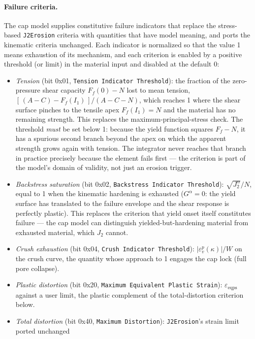 \documentclass[12pt]{article}
\begin{document}
\paragraph{Failure criteria.}
The cap model supplies constitutive failure indicators that replace
the stress-based \texttt{J2Erosion} criteria with quantities that
have model meaning, and ports the kinematic criteria unchanged. Each indicator is normalized so that the value 1
means exhaustion of its mechanism, and each criterion is enabled by
a positive threshold (or limit) in the material input and disabled
at the default 0:
\begin{itemize}
\item \emph{Tension} (bit 0x01, \texttt{Tension Indicator
  Threshold}): the fraction of the zero-pressure shear capacity
  $F_f(0) - N$ lost to mean tension,
  $[\,(A - C) - F_f(I_1)\,]/(A - C - N)$, which reaches 1 where the
  shear surface pinches to the tensile apex $F_f(I_1) = N$ and the
  material has no remaining strength. This replaces the
  maximum-principal-stress check. The threshold \emph{must} be set
  below 1: because the yield function squares $F_f - N$, it has a
  spurious second branch beyond the apex on which the apparent
  strength grows again with tension. The integrator never reaches
  that branch in practice precisely because the element fails
  first --- the criterion is part of the model's domain of validity,
  not just an erosion trigger.
\item \emph{Backstress saturation} (bit 0x02, \texttt{Backstress
  Indicator Threshold}): $\sqrt{J_2^\alpha}/N$, equal to 1 when the
  kinematic hardening is exhausted ($G^\alpha = 0$: the yield
  surface has translated to the failure envelope and the shear
  response is perfectly plastic). This replaces the criterion that
  yield onset itself constitutes failure --- the cap model can
  distinguish yielded-but-hardening material from exhausted
  material, which $J_2$ cannot.
\item \emph{Crush exhaustion} (bit 0x04, \texttt{Crush Indicator
  Threshold}): $|\varepsilon_v^p(\kappa)|/W$ on the crush curve, the
  quantity whose approach to 1 engages the cap lock (full pore
  collapse).
\item \emph{Plastic distortion} (bit 0x20, \texttt{Maximum
  Equivalent Plastic Strain}): $\varepsilon_{\mathrm{eqps}}$ against
  a user limit, the plastic complement of the total-distortion
  criterion below.
\item \emph{Total distortion} (bit 0x40, \texttt{Maximum
  Distortion}): \texttt{J2Erosion}'s strain limit ported unchanged

\end{itemize}
\end{document}
